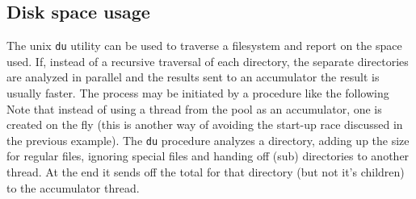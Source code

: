 \bigskip

\subsection{Disk space usage}
The unix \texttt{du} utility can be used to traverse a filesystem and report on
the space used.  If, instead of a recursive traversal of each directory, the
separate directories are analyzed in parallel and the results sent to an
accumulator the result is usually faster. The process may be initiated by a
procedure like the following
{\small
{}
}
Note that instead of using a thread from the pool as an accumulator, one is
created on the fly (this is another way of avoiding the start-up race discussed
in the previous example). The \texttt{du} procedure analyzes a directory, adding
up the size for regular files, ignoring special files and handing off (sub)
directories to another thread. At the end it sends off the total for that
directory (but not it's children) to the accumulator thread.

